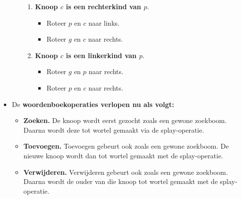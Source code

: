 \begin{itemize}
\begin{enumerate}
        \begin{enumerate}
            \item \textbf{Knoop $c$ is een rechterkind van $p$}.
            \begin{itemize}
                \item Roteer $p$ en $c$ naar links.
                \item Roteer $g$ en $c$ naar rechts.
            \end{itemize}
            \item \textbf{Knoop $c$ is een linkerkind van $p$}.
            \begin{itemize}
                \item Roteer $g$ en $p$ naar rechts.
                \item Roteer $p$ en $c$ naar rechts.
            \end{itemize}
        \end{enumerate}
    \end{enumerate}
    \item De \textbf{woordenboekoperaties verlopen nu als volgt:}
    \begin{itemize}
        \item \textbf{Zoeken.} De knoop wordt eerst gezocht zoals een gewone zoekboom. Daarna wordt deze tot wortel gemaakt via de splay-operatie. 
        \item \textbf{Toevoegen.} Toevoegen gebeurt ook zoals een gewone zoekboom. De nieuwe knoop wordt dan tot wortel gemaakt met de splay-operatie.
        \item \textbf{Verwijderen.} Verwijderen gebeurt ook zoals een gewone zoekboom. Daarna wordt de ouder van die knoop tot wortel gemaakt met de splay-operatie.
    \end{itemize}
\end{itemize}
